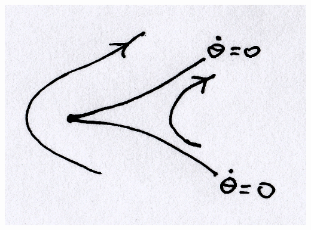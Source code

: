 \documentclass{article}
\begin{document}
\begin{enumerate}[(a)]
\begin{center}
\includegraphics[scale = 0.16]{fig19.png}
\end{center}
\end{enumerate}
%
%
\end{document}
